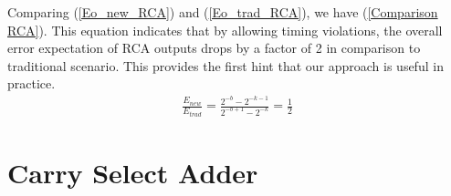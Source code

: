 \documentclass[prodmode,acmtrets]{acmsmall} %
\begin{document}
Comparing (\ref{Eo_new_RCA}) and (\ref{Eo_trad_RCA}), we have (\ref{Comparison RCA}). This equation indicates that by allowing timing violations, the overall error expectation of RCA outputs drops by a factor of 2 in comparison to traditional scenario. This provides the first hint that our approach is useful in practice.
%
\begin{eqnarray}\label{Comparison RCA}
  \frac{E_{new}}{E_{trad}}=\frac{2^{-b}-2^{-k-1}}{2^{-b+1}-2^{-k}}=\frac{1}{2}
\end{eqnarray}

\section{Carry Select Adder}\label{Section_CSA}
\end{document}
